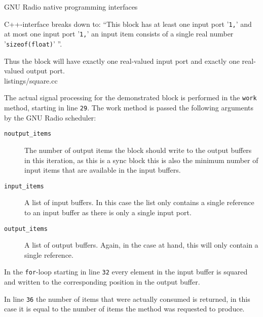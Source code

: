 \begin{subchapter}{GNU Radio native programming interfaces}
\begin{subsubchapter}{C++-interface}
    breaks down to: ``This block has at least one input port '\texttt{1,}' and
    at most one input port '\texttt{1,}' an input item consists of a single real
    number '\texttt{sizeof(float)}' ''.

    Thus the block will have exactly one real-valued input port and exactly
    one real-valued output port. \\

    
                    {listings/square.cc}

    The actual signal processing for the demonstrated block
    is performed in the \texttt{work} method, starting in line
    \texttt{29}. The work method is passed the following arguments
    by the GNU Radio scheduler:

    \begin{description}
      \item[\texttt{noutput\_items}]
        The number of output items the block should write to the output
        buffers in this iteration, as this is a sync block this is also
        the minimum number of input items that are available in the input buffers.

      \item[\texttt{input\_items}]
        A list of input buffers. In this case the list only contains
        a single reference to an input buffer as there is only a
        single input port.

      \item[\texttt{output\_items}]
        A list of output buffers. Again, in the case at hand,
        this will only contain a single reference.
    \end{description}
  \end{subsubchapter}

  In the \texttt{for}-loop starting in line \texttt{32}
  every element in the input buffer is squared and written to
  the corresponding position in the output buffer.

  In line \texttt{36} the number of items that were actually consumed
  is returned, in this case it is equal to the number of items
  the method was requested to produce.
\end{subchapter}
